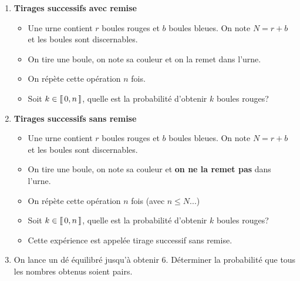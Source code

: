 \documentclass[12pt,a4paper]{article}
\DeclareMathOperator{\lcro}{\textnormal{\textlbrackdbl}}
\DeclareMathOperator{\rcro}{\textnormal{\textrbrackdbl}}
\begin{document}
\begin{enumerate}

\item \textbf{Tirages successifs avec remise}
\begin{itemize}
	\item Une urne contient $r$ boules rouges et $b$ boules bleues. On note $N=r+b$ et  les boules sont discernables.
	
	\item On tire une boule, on note sa couleur et on la remet dans l'urne.
	
	\item On répète cette opération $n$ fois.
	
	\item Soit $k \in \lcro 0,n\rcro$, quelle est la probabilité d'obtenir $k$ boules rouges?
	
\end{itemize}

\item \textbf{Tirages successifs sans remise}
\begin{itemize}
	\item Une urne contient $r$ boules rouges et $b$ boules bleues. On note $N=r+b$ et  les boules sont discernables.
	\item On tire une boule, on note sa couleur et \textbf{on ne la remet pas} dans l'urne.
	\item On répète cette opération $n$ fois (avec $n \leq N$...)
	\item Soit $k \in \lcro 0,n\rcro$, quelle est la probabilité d'obtenir $k$ boules rouges?
	\item Cette exp\'erience est appelée tirage successif sans remise.
	
\end{itemize}

\item On lance un dé équilibré jusqu'à obtenir $6$. Déterminer la probabilité que tous les nombres obtenus soient pairs.


\end{enumerate}
\end{document}
